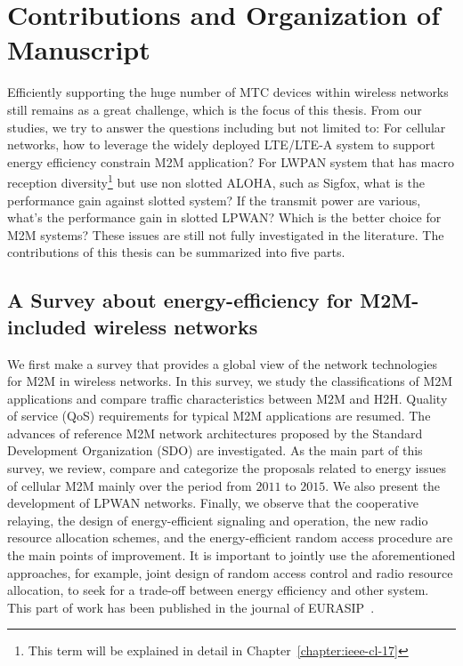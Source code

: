 \section{Contributions and Organization of Manuscript}
\label{sec:introduction-contributions}
Efficiently supporting the huge number of MTC devices within wireless networks still remains as a great challenge, which is the focus of this thesis. From our studies, we try to answer the questions including but not limited to: For cellular networks, how to leverage the widely deployed LTE/LTE-A system to support energy efficiency constrain M2M application? For LWPAN system that has macro reception diversity\footnote{This term will be explained in detail in Chapter~\ref{chapter:ieee-cl-17} } but use non slotted ALOHA, such as Sigfox, what is the performance gain against slotted system? If the transmit power are various, what's the performance gain in slotted LPWAN? 
Which is the better choice for M2M systems? These issues are still not fully investigated in the literature. The contributions of this thesis can be summarized into five parts.
\subsection{A Survey about energy-efficiency for M2M-included wireless networks}
We first make a survey that provides a global view of the network technologies for M2M in wireless networks. In this survey, we study the classifications of M2M applications and compare traffic characteristics between M2M and H2H. Quality of service (QoS) requirements for typical M2M applications are resumed. The advances of reference M2M network architectures proposed by the Standard Development Organization (SDO) are investigated. As the main part of this survey,
we review, compare and categorize the proposals related to energy issues of cellular M2M mainly over the period from $2011$ to $2015$. We also present the development of LPWAN networks. Finally, we observe that the cooperative relaying, the design of energy-efficient signaling and operation, the new radio resource allocation schemes, and the energy-efficient random access procedure are the main points of improvement. It is important to jointly use the aforementioned approaches, for example, joint design of random access control and radio resource allocation, to seek for a trade-off between energy efficiency and other system. This part of work has been published in the journal of EURASIP~\cite{song2016survey}.


